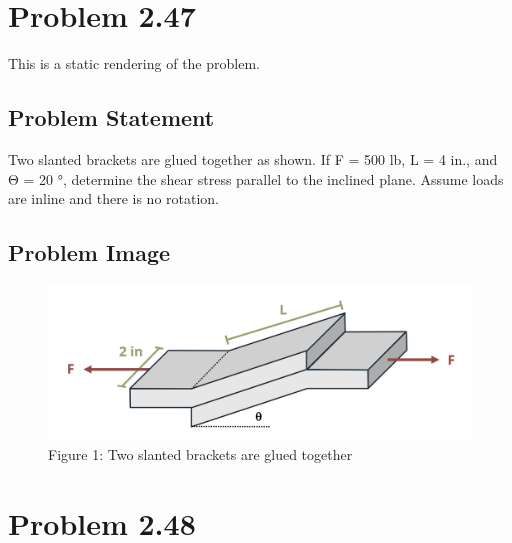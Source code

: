 \documentclass[
  letterpaper,
  DIV=11,
  numbers=noendperiod]{scrreprt}
\begin{document}
\chapter*{Problem 2.47}\label{problem-2.47-1}


This is a static rendering of the problem.

\section*{Problem Statement}\label{problem-statement-4}


Two slanted brackets are glued together as shown. If F = 500 lb, L = 4
in., and Θ = 20 °, determine the shear stress parallel to the inclined
plane. Assume loads are inline and there is no rotation.

\section*{Problem Image}\label{problem-image-14}


\begin{figure}[H]

{\centering \includegraphics{images/153.png}

}

\caption{Figure 1: Two slanted brackets are glued together}

\end{figure}%

\chapter*{Problem 2.48}\label{problem-2.48-1}
\end{document}
